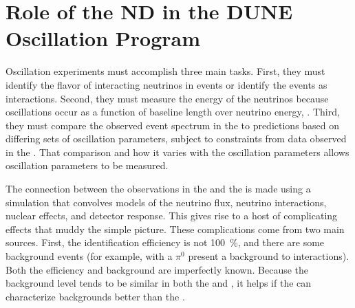 \section{Role of the ND in the DUNE Oscillation Program}
\label{sec:exsum-nd-role}

Oscillation experiments must accomplish three main tasks. First, they must identify the flavor of interacting neutrinos in  events or identify the events as  interactions. Second, they must measure the energy of the neutrinos because oscillations occur as a function of baseline length over neutrino energy, . Third, they must compare the observed event spectrum in the  to  predictions based on differing sets of oscillation parameters, subject to constraints from data observed in the .  That comparison and how it varies with the oscillation parameters allows oscillation parameters to be measured.

The connection between the observations in the  and the  is made using a simulation that convolves models of the neutrino flux, neutrino interactions, nuclear effects, and detector response.
This gives rise to a host of complicating effects that 
muddy the simple picture. These complications come from two main sources. First, the identification efficiency is not \SI{100}{\%}, and there are
some background events (for example,  with a $\pi^0$ present %
a background to \nue {} interactions). Both the efficiency and background are imperfectly known. %
Because the background level tends to be similar in both the  and , it helps if the  can characterize backgrounds better than the . %
%

